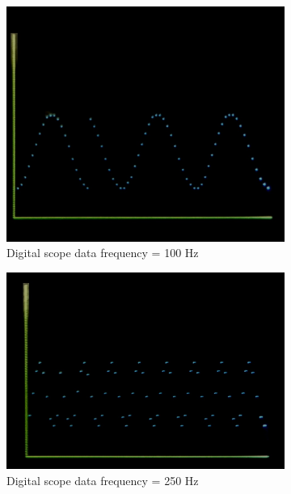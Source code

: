 \documentclass[a4paper]{article}
\newlength{\pic}
\begin{document}
\begin{figure}[htp]
\center
	\begin{subfigure}[H]{\pica}
	\includegraphics[width=\pica]{Images/100Hz}
	\caption{Digital scope data frequency = 100 Hz}
	\end{subfigure}
	\hfill
	\begin{subfigure}[H]{\pica}
	\includegraphics[width=\pica]{Images/250Hz}
	\caption{Digital scope data frequency = 250 Hz}
	\end{subfigure}
	\hfill
	\begin{subfigure}[H]{\pica}

\end{subfigure}
\end{figure}
\end{document}

